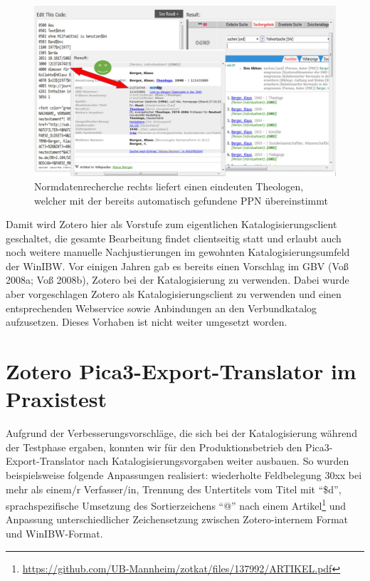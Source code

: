 \documentclass[a4paper,
fontsize=11pt,
oneside,
numbers=noperiodatend,
parskip=half-,
bibliography=totoc,
final
]{scrartcl}
\begin{document}
\begin{figure}[htbp]
\centering
\includegraphics{img/Normdatenrecherche.jpg}
\caption{Normdatenrecherche rechts liefert einen eindeuten Theologen,
welcher mit der bereits automatisch gefundene PPN übereinstimmt}
\end{figure}

Damit wird Zotero hier als Vorstufe zum eigentlichen
Katalogisierungsclient geschaltet, die gesamte Bearbeitung findet
clientseitig statt und erlaubt auch noch weitere manuelle
Nachjustierungen im gewohnten Katalogisierungsumfeld der WinIBW. Vor
einigen Jahren gab es bereits einen Vorschlag im GBV (Voß 2008a; Voß
2008b), Zotero bei der Katalogisierung zu verwenden. Dabei wurde aber
vorgeschlagen Zotero als Katalogisierungsclient zu verwenden und einen
entsprechenden Webservice sowie Anbindungen an den Verbundkatalog
aufzusetzen. Dieses Vorhaben ist nicht weiter umgesetzt worden.

\section*{Zotero Pica3-Export-Translator im
Praxistest}\label{zotero-pica3-export-translator-im-praxistest}

Aufgrund der Verbesserungsvorschläge, die sich bei der Katalogisierung
während der Testphase ergaben, konnten wir für den Produktionsbetrieb
den Pica3-Export-Translator nach Katalogisierungsvorgaben weiter
ausbauen. So wurden beispielsweise folgende Anpassungen realisiert:
wiederholte Feldbelegung 30xx bei mehr als einem/r Verfasser/in,
Trennung des Untertitels vom Titel mit \enquote{\$d}, sprachspezifische
Umsetzung des Sortierzeichens \enquote{@} nach einem Artikel\footnote{\url{https://github.com/UB-Mannheim/zotkat/files/137992/ARTIKEL.pdf}}
und Anpassung unterschiedlicher Zeichensetzung zwischen Zotero-internem
Format und WinIBW-Format.
\end{document}
